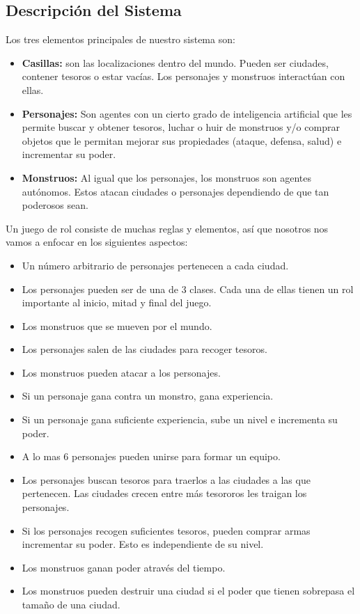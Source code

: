 \subsection*{Descripción del Sistema}{Los tres elementos principales de nuestro
    sistema son:
    \begin{itemize}
    \item{\textbf{Casillas: }son las localizaciones dentro del mundo. Pueden ser
        ciudades, contener tesoros o estar vacías. Los personajes y monstruos
        interactúan con ellas.
    }
    \item{\textbf{Personajes: }Son agentes con un cierto grado de inteligencia
        artificial que les permite buscar y obtener tesoros, luchar o huir de
        monstruos y/o comprar objetos que le permitan mejorar sus propiedades
        (ataque, defensa, salud) e incrementar su poder.
    }
    \item{\textbf{Monstruos: }Al igual que los personajes, los monstruos son
        agentes autónomos. Estos atacan ciudades o personajes dependiendo de que
        tan poderosos sean.
    }
    \end{itemize}
    Un juego de rol consiste de muchas reglas y elementos, así que nosotros nos
    vamos a enfocar en los siguientes aspectos:
    \begin{itemize}
        \item Un número arbitrario de personajes pertenecen a cada ciudad.
        \item Los personajes pueden ser de una de 3 clases. Cada una de ellas
            tienen un rol importante al inicio, mitad y final del juego.
        \item Los monstruos que se mueven por el mundo.
        \item Los personajes salen de las ciudades para recoger tesoros.
        \item Los monstruos pueden atacar a los personajes.
        \item Si un personaje gana contra un monstro, gana experiencia.
        \item Si un personaje gana suficiente experiencia, sube un nivel e
            incrementa su poder.
        \item A lo mas 6 personajes pueden unirse para formar un equipo.
        \item Los personajes buscan tesoros para traerlos a las ciudades a las
            que pertenecen. Las ciudades crecen entre más tesororos les traigan
            los personajes.
        \item Si los personajes recogen suficientes tesoros, pueden comprar
            armas incrementar su poder. Esto es independiente de su nivel.
        \item Los monstruos ganan poder através del tiempo.
        \item Los monstruos pueden destruir una ciudad si el poder que tienen
            sobrepasa el tamaño de una ciudad.
    \end{itemize}
}
